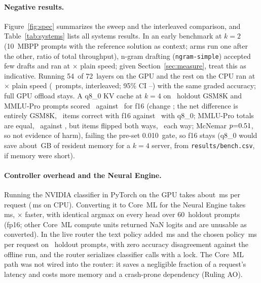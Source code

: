 \documentclass[11pt]{article}
\makeatletter
\def\sg@aux#1#2\relax{\if#1-$-$#2\else\if#1+{+}#2\else{+}#1#2\fi\fi}
\newcommand{\sg}[1]{\expandafter\sg@aux#1\relax}
\newcommand{\LayersAll}{72}
\newcommand{\LayersGpu}{54}
\newcommand{\GateKv}{0.010}%
\newcommand{\AneN}{60}
\newcommand{\NgramPrompts}{10}
\makeatother
\begin{document}
\paragraph{Negative results.}
Figure~\ref{fig:spec} summarizes the sweep and the interleaved comparison, and Table~\ref{tab:systems} lists all systems results. In an early benchmark at $k{=}2$ (\NgramPrompts\ MBPP prompts with the reference solution as context; arms run one after the other, ratio of total throughput), n-gram drafting (\texttt{ngram-simple}) accepted few drafts and ran at \NgramSpeedup$\times$ plain speed; given Section~\ref{sec:measure}, treat this as indicative. Running \LayersGpu\ of \LayersAll\ layers on the GPU and the rest on the CPU ran at \OffloadSpeedup$\times$ plain speed (\OffloadN\ prompts, interleaved; 95\% CI \OffloadLo--\OffloadHi) with the same graded accuracy; full GPU offload stays. A q8\_0 KV cache at $k{=}4$ on \QEightN\ holdout GSM8K and MMLU-Pro prompts scored \QEightAcc\ against \QSixteenAcc\ for f16 (change \sg{\QEightDelta}; the net difference is entirely GSM8K, \QEightGsmSixteen\ items correct with f16 against \QEightGsmEight\ with q8\_0; MMLU-Pro totals are equal, \QEightMmluSixteen\ against \QEightMmluEight, but items flipped both ways, \QEightMmluGainedByEight\ each way; McNemar $p{=}0.51$, so not evidence of harm), failing the pre-set \GateKv\ gate, so f16 stays (q8\_0 would save about \KvSavingGb\,GB of resident memory for a $k{=}4$ server, from \texttt{results/bench.csv}, if memory were short).

\paragraph{Controller overhead and the Neural Engine.}
Running the NVIDIA classifier in PyTorch on the GPU takes about \MpsMs\,ms per request (\CpuMs\,ms on CPU). Converting it to Core~ML for the Neural Engine takes \AneMs\,ms, \AneSpeedup$\times$ faster, with identical argmax on every head over \AneN\ holdout prompts (fp16; other Core~ML compute units returned NaN logits and are unusable as converted). In the live router the text policy added \TextOverheadMs\,ms and the chosen policy \LiveOverheadMs\,ms per request on \LiveGateN\ holdout prompts, with zero accuracy disagreement against the offline run, and the router serializes classifier calls with a lock. The Core~ML path was not wired into the router: it saves a negligible fraction of a request's latency and costs more memory and a crash-prone dependency (Ruling AO).
\end{document}
